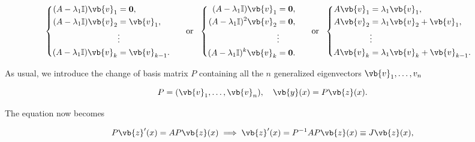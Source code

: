 \documentclass[english,a4paper,12pt]{report}
\begin{document}
\begin{equation}
    \begin{cases}
        \begin{aligned}
            (A-\lambda _{1}\mathbb{I} )\vb{v} _{1} &= \boldsymbol{0} , \\
            (A-\lambda _{1}\mathbb{I} )\vb{v} _{2} & = \vb{v} _{1}  , \\
            &\vdots \\
            (A-\lambda _{1}\mathbb{I} )\vb{v} _{k} &=\vb{v} _{k-1}  .  
        \end{aligned}
    \end{cases}
    ~\text { or }~
    \begin{cases}
        \begin{aligned}
            (A-\lambda _{1}\mathbb{I} )\vb{v} _{1} &= \boldsymbol{0} , \\
            (A-\lambda _{1}\mathbb{I})^2\vb{v} _{2} & = \boldsymbol{0}  , \\
            &\vdots \\
            (A-\lambda _{1}\mathbb{I} )^{k} \vb{v} _{k} &=\boldsymbol{0}   .  
        \end{aligned}
    \end{cases}
    ~\text { or }~
    \begin{cases}
        \begin{aligned}
            A\vb{v} _{1}&=\lambda _{1}\vb{v} _{1},\\
            A\vb{v} _{2}&=\lambda _{1}\vb{v} _{2}+\vb{v} _{1},\\
            &\vdots \\
            A\vb{v} _{k}&=\lambda _{1}\vb{v} _{k}+\vb{v} _{k-1}.           
        \end{aligned}
    \end{cases} 
\end{equation}

As usual, we introduce the change of basis matrix \(P\) containing all the \(n\) generalized eigenvectors \(\vb{v} _{1}, \ldots ,v_{n}  \)

\begin{equation}
    P=(\vb{v} _{1},\ldots ,\vb{v} _{n}  ), \quad \vb{y}(x) = P\vb{z}(x) .
\end{equation}

The equation now becomes

\begin{equation}
    P\vb{z} '(x) = AP\vb{z} (x) \implies \vb{z} '(x) = P^{-1} AP\vb{z} (x) \equiv J\vb{z} (x), 
\end{equation}
\end{document}
